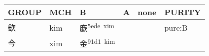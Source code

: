 \documentclass[14pt,a4paper]{scrartcl}
\begin{document}
\begin{longtable}[c]{@{}llllll@{}}
\toprule
\begin{minipage}[b]{0.14\columnwidth}\raggedright\strut
GROUP
\strut\end{minipage} &
\begin{minipage}[b]{0.14\columnwidth}\raggedright\strut
MCH
\strut\end{minipage} &
\begin{minipage}[b]{0.14\columnwidth}\raggedright\strut
B
\strut\end{minipage} &
\begin{minipage}[b]{0.14\columnwidth}\raggedright\strut
A
\strut\end{minipage} &
\begin{minipage}[b]{0.14\columnwidth}\raggedright\strut
none
\strut\end{minipage} &
\begin{minipage}[b]{0.14\columnwidth}\raggedright\strut
PURITY
\strut\end{minipage}\tabularnewline
\midrule
\endhead
\begin{minipage}[t]{0.14\columnwidth}\raggedright\strut
欽
\strut\end{minipage} &
\begin{minipage}[t]{0.14\columnwidth}\raggedright\strut
kim
\strut\end{minipage} &
\begin{minipage}[t]{0.14\columnwidth}\raggedright\strut
廞\textsuperscript{5ede~xim}
\strut\end{minipage} &
\begin{minipage}[t]{0.14\columnwidth}\raggedright\strut
\strut\end{minipage} &
\begin{minipage}[t]{0.14\columnwidth}\raggedright\strut
\strut\end{minipage} &
\begin{minipage}[t]{0.14\columnwidth}\raggedright\strut
pure:B
\strut\end{minipage}\tabularnewline
\begin{minipage}[t]{0.14\columnwidth}\raggedright\strut
今
\strut\end{minipage} &
\begin{minipage}[t]{0.14\columnwidth}\raggedright\strut
xim
\strut\end{minipage} &
\begin{minipage}[t]{0.14\columnwidth}\raggedright\strut
金\textsuperscript{91d1~kim}
\strut\end{minipage} &

\end{longtable}
\end{document}
